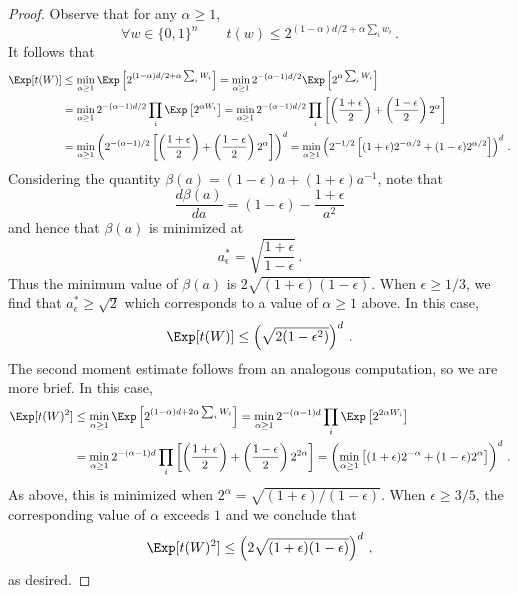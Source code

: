 \begin{proof}
  Observe that for any $\alpha \geq 1$,
  \[
    \forall w\in \{0,1\}^n \qquad t(w) \leq 2^{(1 - \alpha)d/2 + \alpha\sum_i w_i}\,.
  \]
  It follows that
  \begin{align*}
    \Exp[ t(W) ] &\leq \min_{\alpha \geq 1} \Exp\left[2^{(1 - \alpha)d/2 + \alpha\sum_i W_i}\right] = \min_{\alpha \geq 1} 2^{-(\alpha - 1)d/2} \Exp\left[2^{\alpha\sum_i W_i}\right]\\
                 &= \min_{\alpha \geq 1} 2^{-(\alpha - 1)d/2} \prod_i \Exp\left[2^{\alpha W_i}\right] = \min_{\alpha \geq 1} 2^{-(\alpha - 1)d/2} \prod_i \left[\left(\frac{1+\epsilon}{2}\right) + \left(\frac{1-\epsilon}{2}\right) 2^{\alpha}\right]\\
  &= \min_{\alpha \geq 1} \left(2^{-(\alpha - 1)/2} \left[\left(\frac{1+\epsilon}{2}\right) + \left(\frac{1-\epsilon}{2}\right) 2^{\alpha}\right]\right)^d = \min_{\alpha \geq 1} \left(2^{-1/2} \left[(1+\epsilon)2^{-\alpha/2}  + (1-\epsilon) 2^{\alpha/2}\right]\right)^d\,.
\end{align*}
Considering the quantity
$\beta(a) = (1 - \epsilon) a + (1 + \epsilon) a^{-1}$, note that
\[
  \frac{d\beta(a)}{da} = (1 - \epsilon) - \frac{1 + \epsilon}{a^2}
\]
and hence that $\beta(a)$ is minimized at
\[
  a^*_\epsilon = \sqrt{\frac{1 + \epsilon}{1 - \epsilon}}\,.
\]
Thus the minimum value of $\beta(a)$ is
$2\sqrt{(1 + \epsilon)(1 - \epsilon)}$. When $\epsilon \geq 1/3$, we find that $a_\epsilon^* \geq \sqrt{2}$ which corresponds to a value of $\alpha \geq 1$ above. In this case, 
\[
  \Exp[t(W)] \leq \left( \sqrt{2(1 - \epsilon^2)}\right)^d\,.
\]
The second moment estimate follows from an analogous computation, so
we are more brief. In this case,
  \begin{align*}
    \Exp[ t(W)^2 ] &\leq \min_{\alpha \geq 1} \Exp\left[2^{(1 - \alpha)d + 2\alpha\sum_i W_i}\right] = \min_{\alpha \geq 1} 2^{-(\alpha - 1)d} \prod_i \Exp\left[2^{2\alpha W_i}\right]\\
    &= \min_{\alpha \geq 1} 2^{-(\alpha - 1)d} \prod_i \left[\left(\frac{1+\epsilon}{2}\right) + \left(\frac{1-\epsilon}{2}\right) 2^{2\alpha}\right] = \left(\min_{\alpha \geq 1} \left[(1+\epsilon)2^{-\alpha}  + (1-\epsilon) 2^{\alpha}\right]\right)^d\,.
\end{align*}
As above, this is minimized when $2^\alpha = \sqrt{(1 + \epsilon)/(1 - \epsilon)}$. When $\epsilon \geq 3/5$, the corresponding value of $\alpha$ exceeds $1$ and we conclude that
\[
  \Exp[t(W)^2] \leq \left(2\sqrt{(1 + \epsilon)(1 - \epsilon)}\right)^d\,,
\]
as desired.
\end{proof}

